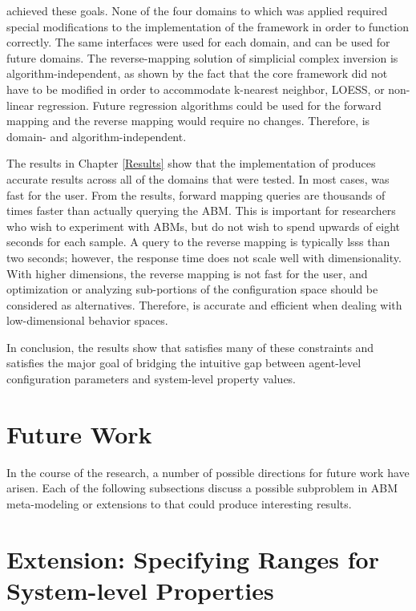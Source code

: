 \fw achieved these goals. None of the four domains to which \fw was applied required special modifications to the implementation of the framework in order to function correctly.
The same interfaces were used for each domain, and can be used for future domains.
The reverse-mapping solution of simplicial complex inversion is algorithm-independent, as shown by the fact that the core framework did not have to be modified in order to accommodate k-nearest neighbor, LOESS, or non-linear regression.
Future regression algorithms could be used for the forward mapping and the reverse mapping would require no changes.
Therefore, \fw is domain- and algorithm-independent.

The results in Chapter \ref{Results} show that the implementation of \fw produces accurate results across all of the domains that were tested.
In most cases, \fw was fast for the user.
From the results, forward mapping queries are thousands of times faster than actually querying the ABM.
This is important for researchers who wish to experiment with ABMs, but do not wish to spend upwards of eight seconds for each sample.
A query to the reverse mapping is typically lsss than two seconds; however, the response time does not scale well with dimensionality.
With higher dimensions, the reverse mapping is not fast for the user, and optimization or analyzing sub-portions of the configuration space should be considered as alternatives.
Therefore, \fw is accurate and efficient when dealing with low-dimensional behavior spaces.

In conclusion, the results show that \fw satisfies many of these constraints and satisfies the major goal of bridging the intuitive gap between agent-level configuration parameters and system-level property values.

\section{Future Work}

In the course of the research, a number of possible directions for future work have arisen.
Each of the following subsections discuss a possible subproblem in ABM meta-modeling or extensions to \fw that could produce interesting results.

\section{Extension: Specifying Ranges for System-level Properties}
\label{sec:ranges}

